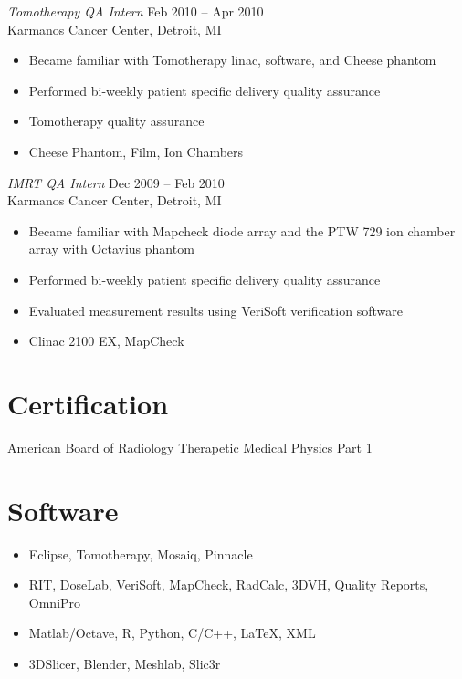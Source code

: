 \documentclass[margin]{res}
\begin{document}
\begin{resume}
{\sl Tomotherapy QA Intern} \hfill         Feb 2010 -- Apr 2010 \\
Karmanos Cancer Center, Detroit, MI
 \begin{itemize}  \itemsep -2pt %
    \item Became familiar with Tomotherapy linac, software, and Cheese phantom
    \item Performed bi-weekly patient specific delivery quality assurance
    \item Tomotherapy quality assurance
    \item Cheese Phantom, Film, Ion Chambers
 \end{itemize} 
{\sl IMRT QA Intern} \hfill                Dec 2009 -- Feb 2010 \\
Karmanos Cancer Center, Detroit, MI
  \begin{itemize}
    \item Became familiar with Mapcheck diode array and the PTW 729 ion chamber array with Octavius phantom
    \item Performed bi-weekly patient specific delivery quality assurance
    \item Evaluated measurement results using VeriSoft verification software
    \item Clinac 2100 EX, MapCheck
   \end{itemize} 

\section{Certification} American Board of Radiology Therapetic Medical Physics Part 1

\section{Software}
\begin{itemize}[noitemsep]
    \item Eclipse, Tomotherapy, Mosaiq, Pinnacle
    \item RIT, DoseLab, VeriSoft, MapCheck, RadCalc, 3DVH, Quality Reports, OmniPro
    \item Matlab/Octave, R, Python, C/C++, LaTeX, XML
    \item 3DSlicer, Blender, Meshlab, Slic3r
\end{itemize}


\end{resume}
\end{document}
